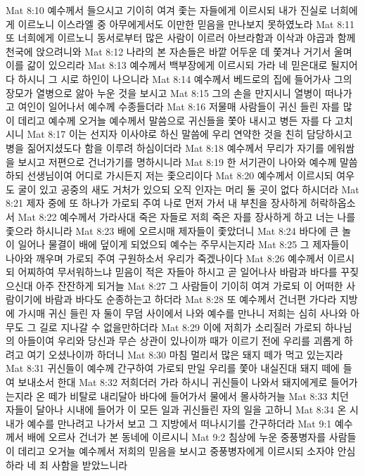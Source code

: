 Mat 8:10  예수께서 들으시고 기이히 여겨 좇는 자들에게 이르시되 내가 진실로 너희에게 이르노니 이스라엘 중 아무에게서도 이만한 믿음을 만나보지 못하였노라
Mat 8:11  또 너희에게 이르노니 동서로부터 많은 사람이 이르러 아브라함과 이삭과 야곱과 함께 천국에 앉으려니와
Mat 8:12  나라의 본 자손들은 바깥 어두운 데 쫓겨나 거기서 울며 이를 갊이 있으리라
Mat 8:13  예수께서 백부장에게 이르시되 가라 네 믿은대로 될지어다 하시니 그 시로 하인이 나으니라
Mat 8:14  예수께서 베드로의 집에 들어가사 그의 장모가 열병으로 앓아 누운 것을 보시고
Mat 8:15  그의 손을 만지시니 열병이 떠나가고 여인이 일어나서 예수께 수종들더라
Mat 8:16  저물매 사람들이 귀신 들린 자를 많이 데리고 예수께 오거늘 예수께서 말씀으로 귀신들을 쫓아 내시고 병든 자를 다 고치시니
Mat 8:17  이는 선지자 이사야로 하신 말씀에 우리 연약한 것을 친히 담당하시고 병을 짊어지셨도다 함을 이루려 하심이더라
Mat 8:18  예수께서 무리가 자기를 에워쌈을 보시고 저편으로 건너가기를 명하시니라
Mat 8:19  한 서기관이 나아와 예수께 말씀하되 선생님이여 어디로 가시든지 저는 좇으리이다
Mat 8:20  예수께서 이르시되 여우도 굴이 있고 공중의 새도 거처가 있으되 오직 인자는 머리 둘 곳이 없다 하시더라
Mat 8:21  제자 중에 또 하나가 가로되 주여 나로 먼저 가서 내 부친을 장사하게 허락하옵소서
Mat 8:22  예수께서 가라사대 죽은 자들로 저희 죽은 자를 장사하게 하고 너는 나를 좇으라 하시니라
Mat 8:23  배에 오르시매 제자들이 좇았더니
Mat 8:24  바다에 큰 놀이 일어나 물결이 배에 덮이게 되었으되 예수는 주무시는지라
Mat 8:25  그 제자들이 나아와 깨우며 가로되 주여 구원하소서 우리가 죽겠나이다
Mat 8:26  예수께서 이르시되 어찌하여 무서워하느냐 믿음이 적은 자들아 하시고 곧 일어나사 바람과 바다를 꾸짖으신대 아주 잔잔하게 되거늘
Mat 8:27  그 사람들이 기이히 여겨 가로되 이 어떠한 사람이기에 바람과 바다도 순종하는고 하더라
Mat 8:28  또 예수께서 건너편 가다라 지방에 가시매 귀신 들린 자 둘이 무덤 사이에서 나와 예수를 만나니 저희는 심히 사나와 아무도 그 길로 지나갈 수 없을만하더라
Mat 8:29  이에 저희가 소리질러 가로되 하나님의 아들이여 우리와 당신과 무슨 상관이 있나이까 때가 이르기 전에 우리를 괴롭게 하려고 여기 오셨나이까 하더니
Mat 8:30  마침 멀리서 많은 돼지 떼가 먹고 있는지라
Mat 8:31  귀신들이 예수께 간구하여 가로되 만일 우리를 쫓아 내실진대 돼지 떼에 들여 보내소서 한대
Mat 8:32  저희더러 가라 하시니 귀신들이 나와서 돼지에게로 들어가는지라 온 떼가 비탈로 내리달아 바다에 들어가서 물에서 몰사하거늘
Mat 8:33  치던 자들이 달아나 시내에 들어가 이 모든 일과 귀신들린 자의 일을 고하니
Mat 8:34  온 시내가 예수를 만나려고 나가서 보고 그 지방에서 떠나시기를 간구하더라
Mat 9:1  예수께서 배에 오르사 건너가 본 동네에 이르시니
Mat 9:2  침상에 누운 중풍병자를 사람들이 데리고 오거늘 예수께서 저희의 믿음을 보시고 중풍병자에게 이르시되 소자야 안심하라 네 죄 사함을 받았느니라
